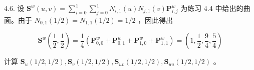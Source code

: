 \documentclass[../main.tex]{subfiles}
\begin{document}
4.6. 设 \({\mathbf{S}}^{w}\left( {u,v}\right)  = \mathop{\sum }\limits_{{i = 0}}^{1}\mathop{\sum }\limits_{{j = 0}}^{1}{N}_{i,1}\left( u\right) {N}_{j,1}\left( v\right) {\mathbf{P}}_{i,j}^{w}\) 为练习 4.4 中给出的曲面。由于 \({N}_{0,1}\left( {1/2}\right)  = {N}_{1,1}\left( {1/2}\right)  = 1/2\) ，因此得出

\[
{\mathbf{S}}^{w}\left( {\frac{1}{2},\frac{1}{2}}\right)  = \frac{1}{4}\left( {{\mathbf{P}}_{0,0}^{w} + {\mathbf{P}}_{0,1}^{w} + {\mathbf{P}}_{1,0}^{w} + {\mathbf{P}}_{1,1}^{w}}\right)  = \left( {1,\frac{1}{2},\frac{9}{4},\frac{5}{4}}\right)
\]

计算 \({\mathbf{S}}_{u}\left( {1/2,1/2}\right) ,{\mathbf{S}}_{v}\left( {1/2,1/2}\right) ,{\mathbf{S}}_{uv}\left( {1/2,1/2}\right) ,{\mathbf{S}}_{uu}\left( {1/2,1/2}\right)\) 。



\clearpage
\end{document}
